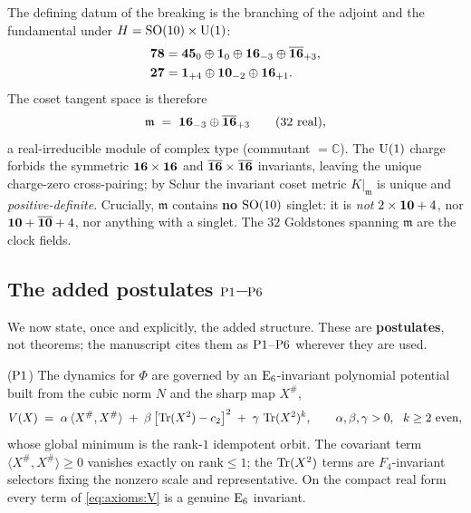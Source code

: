The defining datum of the breaking is the branching of the adjoint and the
fundamental under $H=\mathrm{SO}(10)\times\mathrm{U}(1)$:
\begin{align}
  \mathbf{78} &= \mathbf{45}_{0}\oplus\mathbf{1}_{0}
              \oplus\mathbf{16}_{-3}\oplus\overline{\mathbf{16}}_{+3}, \label{eq:axioms:adj}\\
  \mathbf{27} &= \mathbf{1}_{+4}\oplus\mathbf{10}_{-2}\oplus\mathbf{16}_{+1}.
              \label{eq:axioms:fund}
\end{align}
The coset tangent space is therefore
\begin{equation}\label{eq:axioms:tangent}
  \mathfrak m \;=\; \mathbf{16}_{-3}\oplus\overline{\mathbf{16}}_{+3}
  \qquad (32\ \text{real}),
\end{equation}
a real-irreducible module of complex type (commutant $=\mathbb C$). The
$\mathrm{U}(1)$ charge forbids the symmetric $\mathbf{16}\times\mathbf{16}$ and
$\overline{\mathbf{16}}\times\overline{\mathbf{16}}$ invariants, leaving the unique charge-zero
cross-pairing; by Schur the invariant coset metric $K|_{\mathfrak m}$ is
unique and \emph{positive-definite}. Crucially, $\mathfrak m$ contains
\textbf{no} $\mathrm{SO}(10)$ singlet: it is \emph{not} $2\times\mathbf{10}+4$, nor
$\mathbf{10}+\overline{\mathbf{10}}+4$, nor anything with a singlet. The $32$ Goldstones
spanning $\mathfrak m$ are the clock fields.

\subsection{The added postulates \texorpdfstring{$\textnormal{P1}$--$\textnormal{P6}$}{P1--P6}}
\label{sec:axioms:postulates}

We now state, once and explicitly, the added structure. These are
\textbf{postulates}, not theorems; the manuscript cites them as
$\textnormal{P1}$--$\textnormal{P6}$ wherever they are used.

\begin{postulate}\label{post:axioms:P1}
($\textnormal{P1}$) The dynamics for $\Phi$ are governed by an $\mathrm{E}_{6}$-invariant
polynomial potential built from the cubic norm $N$ and the sharp map
$X^{\#}$,
\begin{equation}\label{eq:axioms:V}
  V(X)\;=\;\alpha\,\langle X^{\#},X^{\#}\rangle
          \;+\;\beta\,\bigl[\operatorname{Tr}(X^2)-c_2\bigr]^2
          \;+\;\gamma\,\operatorname{Tr}(X^2)^{k},
  \qquad \alpha,\beta,\gamma>0,\ \ k\ge2\ \text{even},
\end{equation}
whose global minimum is the rank-$1$ idempotent orbit. The covariant term
$\langle X^{\#},X^{\#}\rangle\ge0$ vanishes exactly on $\mathrm{rank}\le1$;
the $\operatorname{Tr}(X^2)$ terms are $F_4$-invariant selectors fixing the nonzero scale
and representative. On the compact real form every term of
\eqref{eq:axioms:V} is a genuine $\mathrm{E}_{6}$ invariant.
\end{postulate}

